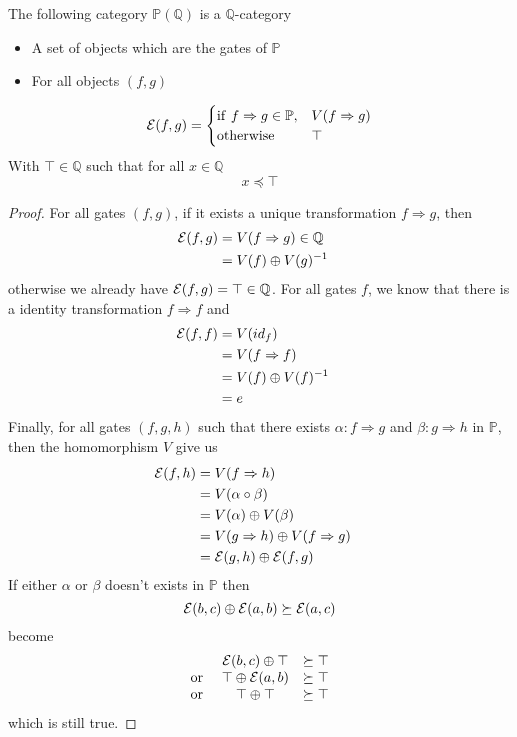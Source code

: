 \documentclass[a4paper]{article}
\begin{document}
\begin{proposition}
The following category $\mathbb{P}(\mathbb{Q})$ is a $\mathbb{Q}$-category
\begin{itemize}
\item A set of objects which are the gates of $\mathbb{P}$
\item For all objects $(f, g)$
\end{itemize}
\[
{\cal E}(f, g) =
\begin{cases}
{\rm if~} f \Rightarrow g \in \mathbb{P}, &V(f \Rightarrow g) \cr
{\rm otherwise~} &\top
\end{cases}
\]
With $\top \in \mathbb{Q}$ such that for all $x \in \mathbb{Q}$
\[
x \preceq \top
\]

\begin{proof}
For all gates $(f, g)$, if it exists a unique transformation $f \Rightarrow
  g$, then
\begin{align}
{\cal E}(f, g) &= V(f \Rightarrow g) \in \mathbb{Q} \cr
&= V(f) \oplus V(g)^{-1}
\end{align}
otherwise we already have ${\cal E}(f, g) = \top \in \mathbb{Q}$.
For all gates $f$, we know that there is a identity transformation $f
  \Rightarrow f$ and
\begin{align}
{\cal E}(f, f) &= V(id_f) \cr
&= V(f \Rightarrow f)\cr
&= V(f) \oplus V(f)^{-1} \cr
&= e
\end{align}
Finally, for all gates $(f, g, h)$ such that there exists $\alpha: f \Rightarrow
  g$ and $\beta: g \Rightarrow h$ in $\mathbb{P}$, then the homomorphism $V$
    give us
\begin{align}
{\cal E}(f, h) &= V(f \Rightarrow h) \cr
&= V(\alpha \circ \beta) \cr
&= V(\alpha) \oplus V(\beta) \cr
&= V(g \Rightarrow h) \oplus V(f \Rightarrow g) \cr
&= {\cal E}(g, h) \oplus {\cal E}(f, g)
\end{align}
If either $\alpha$ or $\beta$ doesn't exists in $\mathbb{P}$ then
\[
{\cal E}(b, c) \oplus {\cal E}(a, b) \succeq {\cal E}(a, c)
\]
become
\[\begin{matrix}
&{\cal E}(b, c) \oplus \top &\succeq \top \cr
{\rm or~} &\top \oplus {\cal E}(a, b) &\succeq \top \cr
{\rm or~} &\top \oplus \top &\succeq \top
\end{matrix}\]
which is still true.
\end{proof}
\end{proposition}
\end{document}
